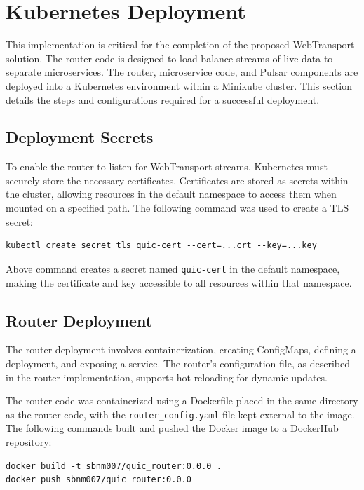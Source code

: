 \section{Kubernetes Deployment}
This implementation is critical for the completion of the proposed WebTransport solution. The router code is designed to load balance streams of live data to separate microservices. The router, microservice code, and Pulsar components are deployed into a Kubernetes environment within a Minikube cluster. This section details the steps and configurations required for a successful deployment.

\subsection{Deployment Secrets}
To enable the router to listen for WebTransport streams, Kubernetes must securely store the necessary certificates. Certificates are stored as secrets within the cluster, allowing resources in the default namespace to access them when mounted on a specified path. The following command was used to create a TLS secret:

\begin{lstlisting}[breaklines=true,basicstyle=\small\ttfamily,frame=single]
kubectl create secret tls quic-cert --cert=...crt --key=...key
\end{lstlisting}

Above command creates a secret named \texttt{quic-cert} in the default namespace, making the certificate and key accessible to all resources within that namespace.

\subsection{Router Deployment}
The router deployment involves containerization, creating ConfigMaps, defining a deployment, and exposing a service. The router’s configuration file, as described in the router implementation, supports hot-reloading for dynamic updates.

The router code was containerized using a Dockerfile placed in the same directory as the router code, with the \texttt{router\_config.yaml} file kept external to the image. The following commands built and pushed the Docker image to a DockerHub repository:

\begin{lstlisting}[breaklines=true,basicstyle=\small\ttfamily,frame=single]
docker build -t sbnm007/quic_router:0.0.0 .
docker push sbnm007/quic_router:0.0.0
\end{lstlisting}

